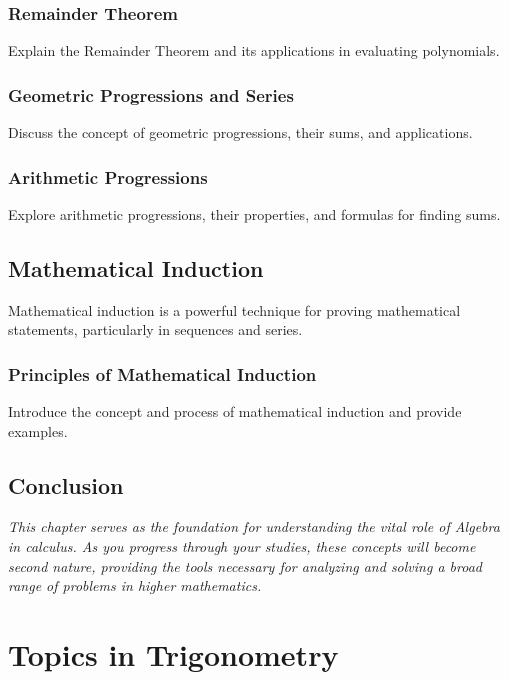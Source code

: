 \documentclass[a4paper,12pt]{book}
\newcounter{problem}
\newcounter{example}
\begin{document}
\subsection{Remainder Theorem}
\label{subsec:remainder_theorem}
Explain the Remainder Theorem and its applications in evaluating polynomials.


\subsection{Geometric Progressions and Series}
\label{subsec:geometric_progressions_series}
Discuss the concept of geometric progressions, their sums, and applications.


\subsection{Arithmetic Progressions}
\label{subsec:arithmetic_progressions}
Explore arithmetic progressions, their properties, and formulas for finding sums.


\section{Mathematical Induction}
\label{sec:mathematical_induction}
Mathematical induction is a powerful technique for proving mathematical statements, particularly in sequences and series.


\subsection{Principles of Mathematical Induction}
\label{subsec:principles_mathematical_induction}
Introduce the concept and process of mathematical induction and provide examples.


\section*{Conclusion}
\label{sec:alg_conclusion}
\textit{This chapter serves as the foundation for understanding the vital role of Algebra in calculus. As you progress through your studies, these concepts will become second nature, providing the tools necessary for analyzing and solving a broad range of problems in higher mathematics.}



\chapter{Topics in Trigonometry}
\end{document}
